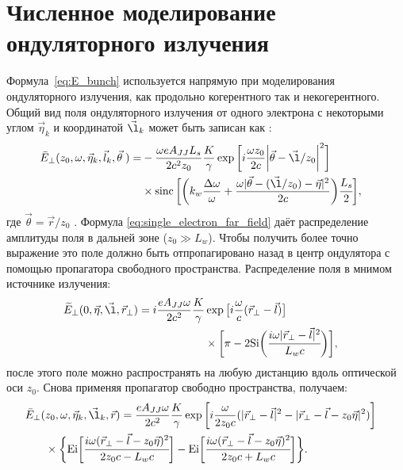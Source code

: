 \section{Численное моделирование ондуляторного излучения}

Формула~\ref{eq:E_bunch} используется напрямую при моделирования ондуляторного излучения, как продольно когерентного так и некогерентного. Общий вид поля ондуляторного излучения от одного электрона с некоторыми углом $\vec{\eta}_k$ и координатой $\vec{\l}_k$ может быть записан как \cite{geloni_fourier_2007} : 
\begin{align}
	\bar{E}_{\bot}(z_0, \omega, \vec{\eta}_k, \vec{l}_k, \vec{\theta} \;) =
&	-\frac{\omega e A_{JJ} L_s}{2c^2z_0}\frac{K}{\gamma}\exp{\bigg[i \frac{\omega z_0}{2c} \bigg|\vec{\theta} - \vec{\l}/z_0\bigg|^2 \bigg]} \cr & \times \sinc \bigg[\bigg(k_w \frac{\Delta \omega}{\omega} + \frac{\omega |\vec{\theta} - (\vec{\l}/z_0) - \vec{\eta}|^2}{2c}\bigg)\cfrac{L_s}{2}\bigg],
	\label{eq:single_electron_far_field}
\end{align}
где $\vec{\theta} = \vec{r}/z_0$ . Формула \ref{eq:single_electron_far_field} даёт распределение амплитуды поля в дальней зоне ($z_0 \gg L_w$). Чтобы получить более точно выражение это поле должно быть отпропагировано назад в центр ондулятора с помощью пропагатора свободного пространства. Распределение поля в мнимом источнике излучения: 
\begin{align}
	\widetilde{E}_{\bot}(0, \vec{\eta}, \vec{\l}, \vec{r}_{\bot}) =
	i \frac{e A_{JJ} \omega}{2 c^2}\frac{K}{\gamma} &\exp{\big[i \frac{\omega}{c} (\vec{r}_{\bot} - \vec{l})\big]}\cr & \times \bigg [\pi - 2\text{Si} \bigg( \cfrac{i \omega |\vec{r}_{\bot} - \vec{l}|^2}{L_w c}\bigg)\bigg], 
	\label{eq:single_electron_near_field_z=0}
\end{align}
после этого поле можно распространять на любую дистанцию вдоль оптической оси $z_0$. Снова применяя пропагатор свободно пространства, получаем:
\begin{align}
	\bar{E}_{\bot}(&z_0, \omega, \vec{\eta}_k, \vec{\l}_k, \vec{r}) =
		\frac{e A_{JJ} \omega}{2 c^2}\frac{K}{\gamma} \exp{\bigg[i \frac{\omega}{2 z_0 c} (|\vec{r}_{\bot} - \vec{l}|^2 - |\vec{r}_{\bot} - \vec{l} - z_0 \vec{\eta}|^2) \bigg]} \cr & \times	\bigg \{ \text{Ei} \bigg[ \cfrac{i \omega (\vec{r}_{\bot} - \vec{l} - z_0 \vec{\eta})^2}{2z_0c - L_w c}\bigg] - \text{Ei} \bigg[ \cfrac{i \omega (\vec{r}_{\bot} - \vec{l} - z_0 \vec{\eta})^2}{2z_0c + L_w c} \bigg] \bigg\}.
	\label{eq:single_electron_near_field}
\end{align}
